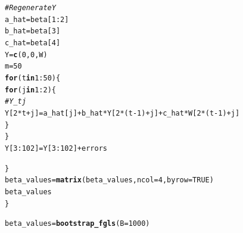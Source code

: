 \documentclass[11pt]{article}\usepackage[]{graphicx}\usepackage[]{color}
\makeatletter
\newcommand{\hlnum}[1]{\textcolor[rgb]{0.686,0.059,0.569}{#1}}%
\newcommand{\hlcom}[1]{\textcolor[rgb]{0.678,0.584,0.686}{\textit{#1}}}%
\newcommand{\hlopt}[1]{\textcolor[rgb]{0,0,0}{#1}}%
\newcommand{\hlstd}[1]{\textcolor[rgb]{0.345,0.345,0.345}{#1}}%
\newcommand{\hlkwa}[1]{\textcolor[rgb]{0.161,0.373,0.58}{\textbf{#1}}}%
\newcommand{\hlkwb}[1]{\textcolor[rgb]{0.69,0.353,0.396}{#1}}%
\newcommand{\hlkwc}[1]{\textcolor[rgb]{0.333,0.667,0.333}{#1}}%
\newcommand{\hlkwd}[1]{\textcolor[rgb]{0.737,0.353,0.396}{\textbf{#1}}}%
\newenvironment{kframe}{%
 \def\at@end@of@kframe{}%
 \ifinner\ifhmode%
  \def\at@end@of@kframe{\end{minipage}}%
  \begin{minipage}{\columnwidth}%
 \fi\fi%
 \def\FrameCommand##1{\hskip\@totalleftmargin \hskip-\fboxsep
 \colorbox{shadecolor}{##1}\hskip-\fboxsep
     \hskip-\linewidth \hskip-\@totalleftmargin \hskip\columnwidth}%
 \MakeFramed {\advance\hsize-\width
   \@totalleftmargin\z@ \linewidth\hsize
   \@setminipage}}%
 {\par\unskip\endMakeFramed%
 \at@end@of@kframe}
\newenvironment{knitrout}{}{} %
\makeatother
\begin{document}
\begin{knitrout}
\begin{kframe}
\begin{alltt}
    \hlcom{# Regenerate Y}
    \hlstd{a_hat} \hlkwb{=} \hlstd{beta[}\hlnum{1}\hlopt{:}\hlnum{2}\hlstd{]}
    \hlstd{b_hat} \hlkwb{=} \hlstd{beta[}\hlnum{3}\hlstd{]}
    \hlstd{c_hat} \hlkwb{=} \hlstd{beta[}\hlnum{4}\hlstd{]}
    \hlstd{Y} \hlkwb{=} \hlkwd{c}\hlstd{(}\hlnum{0}\hlstd{,}\hlnum{0}\hlstd{,W)}
    \hlstd{m} \hlkwb{=} \hlnum{50}
    \hlkwa{for} \hlstd{(t} \hlkwa{in} \hlnum{1}\hlopt{:}\hlnum{50}\hlstd{) \{}
      \hlkwa{for} \hlstd{(j} \hlkwa{in} \hlnum{1}\hlopt{:}\hlnum{2}\hlstd{)\{}
        \hlcom{# Y_tj}
        \hlstd{Y[}\hlnum{2}\hlopt{*}\hlstd{t}\hlopt{+}\hlstd{j]} \hlkwb{=} \hlstd{a_hat[j]} \hlopt{+} \hlstd{b_hat}\hlopt{*}\hlstd{Y[}\hlnum{2}\hlopt{*}\hlstd{(t}\hlopt{-}\hlnum{1}\hlstd{)}\hlopt{+}\hlstd{j]} \hlopt{+} \hlstd{c_hat}\hlopt{*}\hlstd{W[}\hlnum{2}\hlopt{*}\hlstd{(t}\hlopt{-}\hlnum{1}\hlstd{)}\hlopt{+}\hlstd{j]}
      \hlstd{\}}
    \hlstd{\}}
    \hlstd{Y[}\hlnum{3}\hlopt{:}\hlnum{102}\hlstd{]}  \hlkwb{=} \hlstd{Y[}\hlnum{3}\hlopt{:}\hlnum{102}\hlstd{]} \hlopt{+} \hlstd{errors}

  \hlstd{\}}
  \hlstd{beta_values} \hlkwb{=} \hlkwd{matrix}\hlstd{(beta_values,}\hlkwc{ncol}\hlstd{=}\hlnum{4}\hlstd{,}\hlkwc{byrow}\hlstd{=}\hlnum{TRUE}\hlstd{)}
  \hlstd{beta_values}
\hlstd{\}}

\hlstd{beta_values} \hlkwb{=} \hlkwd{bootstrap_fgls}\hlstd{(}\hlkwc{B}\hlstd{=}\hlnum{1000}\hlstd{)}



\end{alltt}
\end{kframe}
\end{knitrout}
\end{document}
